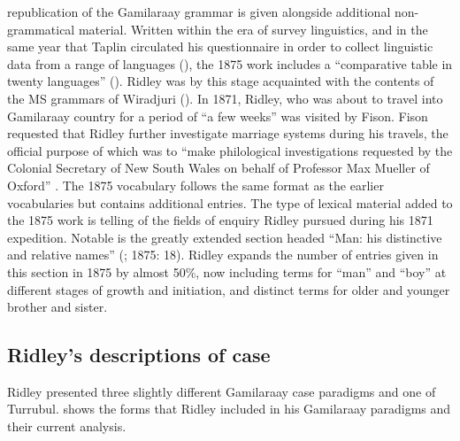  republication of the Gamilaraay grammar is given alongside additional non-grammatical material. Written within the era of survey linguistics, and in the same year that Taplin circulated his questionnaire in order to collect linguistic data from a range of languages (), the 1875 work includes a “comparative table in twenty languages” (\citeyear[119--134]{ridley_kamilaroi_1875}). Ridley was by this stage acquainted with the contents of the MS grammars of Wiradjuri (). In 1871, Ridley, who was about to travel into Gamilaraay country for a period of “a few weeks” \citep[v]{ridley_kamilaroi_1875} was visited by Fison. Fison requested that Ridley further investigate marriage systems during his travels, the official purpose of which was to “make philological investigations requested by the Colonial Secretary of New South Wales on behalf of Professor Max Mueller of Oxford” \citep[30]{langham_building_1981}. The 1875 vocabulary follows the same format as the earlier vocabularies but contains additional entries. The type of lexical material added to the 1875 work is telling of the fields of enquiry Ridley pursued during his 1871 expedition. Notable is the greatly extended section headed “Man: his distinctive and relative names” (\citeyear[17]{ridley_kamilaroi_1866}; 1875: 18). Ridley expands the number of entries given in this section in 1875 by almost 50\%, now including terms for “man” and “boy” at different stages of growth and initiation, and distinct terms for older and younger brother and sister.

\subsection{Ridley’s descriptions of case}
\label{sec:key:4.5.4}

Ridley presented three slightly different Gamilaraay case paradigms and one of Turrubul.  shows the forms that Ridley included in his Gamilaraay paradigms and their current analysis.

